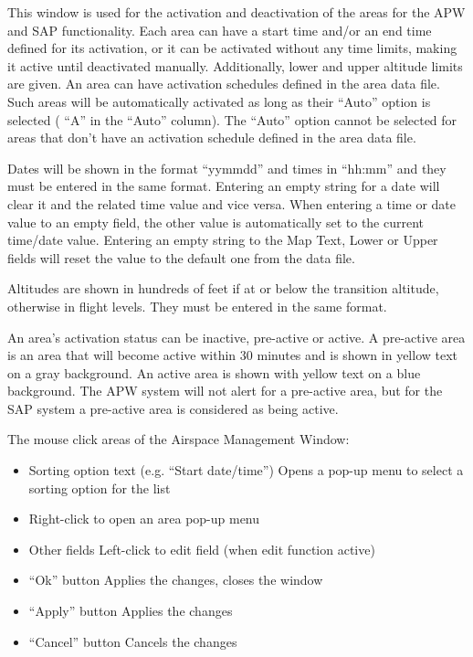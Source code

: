 \documentclass[11pt,a4paper]{memoir}
\begin{document}
This window is used for the activation and deactivation of the areas for the APW and SAP functionality. Each area can have a start time and/or an end time defined for its activation, or it can be activated without any time limits, making it active until deactivated manually. Additionally, lower and upper altitude limits are given. An area can have activation schedules defined in the area data file. Such areas will be automatically activated as long as their “Auto” option is selected ( “A” in the “Auto” column). The “Auto” option cannot be selected for areas that don’t have an activation schedule defined in the area data file.

Dates will be shown in the format “yymmdd” and times in “hh:mm” and they must be entered in the same format. Entering an empty string for a date will clear it and the related time value and vice versa. When entering a time or date value to an empty field, the other value is automatically set to the current time/date value. Entering an empty string to the Map Text, Lower or Upper fields will reset the value to the default one from the data file.

Altitudes are shown in hundreds of feet if at or below the transition altitude, otherwise in flight levels. They must be entered in the same format.

An area’s activation status can be inactive, pre-active or active. A pre-active area is an area that will become active within 30 minutes and is shown in yellow text on a gray background. An active area is shown with yellow text on a blue background. The APW system will not alert for a pre-active area, but for the SAP system a pre-active area is considered as being active.

The mouse click areas of the Airspace Management Window:
\begin{itemize}[\textbullet] 
        \item Sorting option text (e.g. “Start date/time”) Opens a pop-up menu to select a sorting option for the list 
        \item Right-click to open an area pop-up menu
        \item Other fields Left-click to edit field (when edit function active)
        \item “Ok” button Applies the changes, closes the window
        \item “Apply” button Applies the changes
        \item “Cancel” button Cancels the changes 
\end{itemize}
\end{document}
